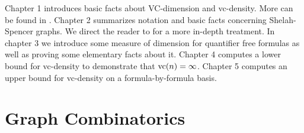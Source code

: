 \documentclass{amsart}
\newcommand{\MM}{\mathscr M}
\newcommand{\A}{\mathcal A}
\newcommand{\B}{\mathcal B}
\begin{document}
Chapter 1 introduces basic facts about VC-dimension and vc-density.
More can be found in \cite{density}.
Chapter 2 summarizes notation and basic facts concerning Shelah-Spencer graphs.
We direct the reader to \cite{laskowski} for a more in-depth treatment.
In chapter 3 we introduce some measure of dimension for quantifier free formulas as well as proving some elementary facts about it.
Chapter 4 computes a lower bound for vc-density to demonstrate that $\operatorname{vc}(n) = \infty$.
Chapter 5 computes an upper bound for vc-density on a formula-by-formula basis.




\section{Graph Combinatorics}
\end{document}

